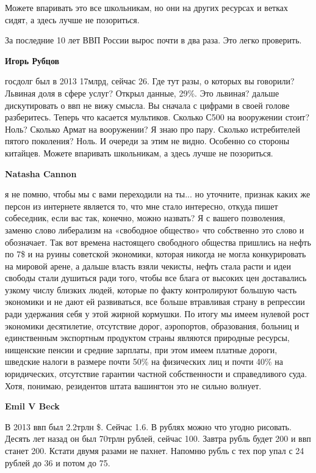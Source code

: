 \begin{itemize}
\begin{itemize}
Можете впаривать это все школьникам, но они на других ресурсах и ветках сидят,
а здесь лучше не позориться.

За последние 10 лет ВВП России вырос почти в два раза. Это легко проверить.

\textbf{Игорь Рубцов} 

госдолг был в 2013 17млрд, сейчас 26. Где тут разы, о которых вы говорили?
Львиная доля в сфере услуг? Открыл данные, 29\%. Это львиная? дальше
дискутировать о ввп не вижу смысла. Вы сначала с цифрами в своей голове
разберитесь. Теперь что касается мультиков. Сколько С500 на вооружении стоит?
Ноль? Сколько Армат на вооружении? Я знаю про пару. Сколько истребителей пятого
поколения? Ноль. И очереди за этим не видно. Особенно со стороны китайцев.
Можете впаривать школьникам, а здесь лучше не позориться.

\textbf{Natasha Cannon} 

я не помню, чтобы мы с вами переходили на ты... но уточните, признак каких же
персон из интернете является то, что мне стало интересно, откуда пишет
собеседник, если вас так, конечно, можно назвать? Я с вашего позволения, заменю
слово либерализм на «свободное общество» что собственно это слово и обозначает.
Так вот времена настоящего свободного общества пришлись на нефть по 7\$ и на
руины советской экономики, которая никогда не могла конкурировать на мировой
арене, а дальше власть взяли чекисты, нефть стала расти и идеи свободы стали
душиться ради того, чтобы все блага от высоких цен доставались узкому числу
близких людей, которые по факту контролируют большую часть экономики и не дают
ей развиваться, все больше втравливая страну в репрессии ради удержания себя у
этой жирной кормушки. По итогу мы имеем нулевой рост экономики десятилетие,
отсутствие дорог, аэропортов, образования, больниц и единственным экспортным
продуктом страны являются природные ресурсы, нищенские пенсии и средние
зарплаты, при этом имеем платные дороги, шведские налоги в размере почти 50\% на
физических лиц и почти 40\% на юридических, отсутствие гарантии частной
собственности и справедливого суда. Хотя, понимаю, резидентов штата вашингтон
это не сильно волнует.


\textbf{Emil V Beck} 

В 2013 ввп был 2.2трлн \$. Сейчас 1.6. В рублях можно что угодно рисовать.
Десять лет назад он был 70трлн рублей, сейчас 100. Завтра рубль будет 200 и ввп
станет 200. Кстати двумя разами не пахнет. Напомню рубль с тех пор упал с 24
рублей до 36 и потом до 75.


\end{itemize}
\end{itemize}
